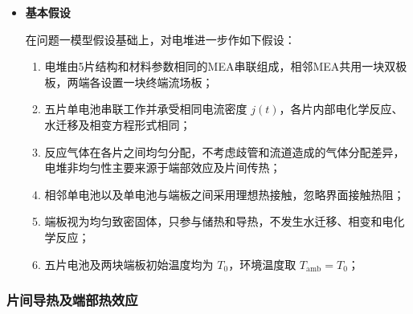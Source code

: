 \documentclass[bwprint]{gmcmthesis}
\numberwithin{figure}{section}
\begin{document}
\begin{itemize}
\noindent 其中，\(g_c\) 为相邻单电池间单位面积热导，\(g_E\) 为端部单电池与端板之间的单位面积耦合热导。端部单电池1和5同时按照题给条件与低温环境进行对流换热。

\noindent 端板不能简单并入端部单电池作为同一等温节点。端板单位面积热容约为 \(3.95 \times 10^4 \, \text{J m}^{-2}\text{K}^{-1}\)，明显高于单电池节点热容，其与端部单电池之间的传热过程与冷启动时间处于相近时间尺度。因此若将端板和端部单电池强制等温，会忽略端板的瞬态吸热特性，并高估端部单电池的实际升温能力。源模型因此采用独立端板节点处理。


\item \textbf {基本假设}

\noindent 在问题一模型假设基础上，对电堆进一步作如下假设：

\begin{enumerate}
    \item 电堆由5片结构和材料参数相同的MEA串联组成，相邻MEA共用一块双极板，两端各设置一块终端流场板；
    \item 五片单电池串联工作并承受相同电流密度 \(j(t)\)，各片内部电化学反应、水迁移及相变方程形式相同；
    \item 反应气体在各片之间均匀分配，不考虑歧管和流道造成的气体分配差异，电堆非均匀性主要来源于端部效应及片间传热；
    \item 相邻单电池以及单电池与端板之间采用理想热接触，忽略界面接触热阻；
    \item 端板视为均匀致密固体，只参与储热和导热，不发生水迁移、相变和电化学反应；
    \item 五片电池及两块端板初始温度均为 \(T_0\)，环境温度取 \(T_{\text{amb}} = T_0\)；
\end{enumerate}

\end{itemize}

\subsubsection{片间导热及端部热效应}
\end{document}
